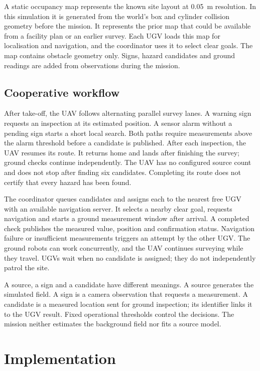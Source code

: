 \documentclass[conference]{IEEEtran}
\begin{document}
A static occupancy map represents the known site layout at \SI{0.05}{\metre} resolution. In this simulation it is generated from the world's box and cylinder collision geometry before the mission. It represents the prior map that could be available from a facility plan or an earlier survey. Each UGV loads this map for localisation and navigation, and the coordinator uses it to select clear goals. The map contains obstacle geometry only. Signs, hazard candidates and ground readings are added from observations during the mission.

\subsection{Cooperative workflow}
After take-off, the UAV follows alternating parallel survey lanes. A warning sign requests an inspection at its estimated position. A sensor alarm without a pending sign starts a short local search. Both paths require measurements above the alarm threshold before a candidate is published. After each inspection, the UAV resumes its route. It returns home and lands after finishing the survey; ground checks continue independently. The UAV has no configured source count and does not stop after finding six candidates. Completing its route does not certify that every hazard has been found.

The coordinator queues candidates and assigns each to the nearest free UGV with an available navigation server. It selects a nearby clear goal, requests navigation and starts a ground measurement window after arrival. A completed check publishes the measured value, position and confirmation status. Navigation failure or insufficient measurements triggers an attempt by the other UGV. The ground robots can work concurrently, and the UAV continues surveying while they travel. UGVs wait when no candidate is assigned; they do not independently patrol the site.

A source, a sign and a candidate have different meanings. A source generates the simulated field. A sign is a camera observation that requests a measurement. A candidate is a measured location sent for ground inspection; its identifier links it to the UGV result. Fixed operational thresholds control the decisions. The mission neither estimates the background field nor fits a source model.

\section{Implementation}
\end{document}
